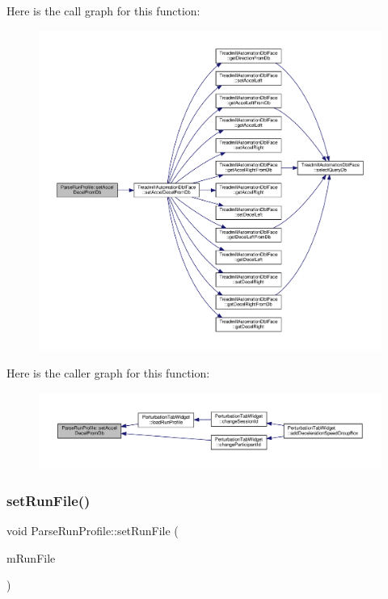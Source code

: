 Here is the call graph for this function\+:
\nopagebreak
\begin{figure}[H]
\begin{center}
\leavevmode
\includegraphics[width=350pt]{class_parse_run_profile_abd04ee7860c35aa5a87442c67ad38452_cgraph}
\end{center}
\end{figure}
Here is the caller graph for this function\+:
\nopagebreak
\begin{figure}[H]
\begin{center}
\leavevmode
\includegraphics[width=350pt]{class_parse_run_profile_abd04ee7860c35aa5a87442c67ad38452_icgraph}
\end{center}
\end{figure}
\mbox{\label{class_parse_run_profile_a7d1a1e31457aaac5f87067181588e8c7}} 
\subsubsection{\texorpdfstring{set\+Run\+File()}{setRunFile()}}
{\footnotesize\ttfamily void Parse\+Run\+Profile\+::set\+Run\+File (\begin{DoxyParamCaption}\item[{Q\+String}]{m\+Run\+File }\end{DoxyParamCaption})}



